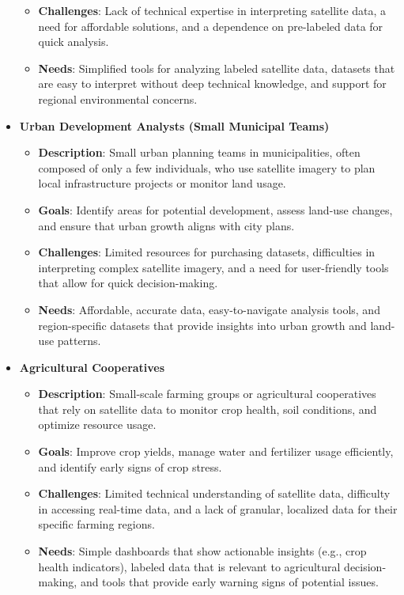 \documentclass[12pt]{article}
\begin{document}
\begin{itemize}
\begin{itemize}
        \item \textbf{Challenges}: Lack of technical expertise in interpreting satellite data, a need for affordable solutions, and a dependence on pre-labeled data for quick analysis.
        \item \textbf{Needs}: Simplified tools for analyzing labeled satellite data, datasets that are easy to interpret without deep technical knowledge, and support for regional environmental concerns.
    \end{itemize}
    \item \textbf{Urban Development Analysts (Small Municipal Teams)}
    \begin{itemize}
        \item \textbf{Description}: Small urban planning teams in municipalities, often composed of only a few individuals, who use satellite imagery to plan local infrastructure projects or monitor land usage.
        \item \textbf{Goals}: Identify areas for potential development, assess land-use changes, and ensure that urban growth aligns with city plans.
        \item \textbf{Challenges}: Limited resources for purchasing datasets, difficulties in interpreting complex satellite imagery, and a need for user-friendly tools that allow for quick decision-making.
        \item \textbf{Needs}: Affordable, accurate data, easy-to-navigate analysis tools, and region-specific datasets that provide insights into urban growth and land-use patterns.
    \end{itemize}
    \item \textbf{Agricultural Cooperatives}
    \begin{itemize}
        \item \textbf{Description}: Small-scale farming groups or agricultural cooperatives that rely on satellite data to monitor crop health, soil conditions, and optimize resource usage.
        \item \textbf{Goals}: Improve crop yields, manage water and fertilizer usage efficiently, and identify early signs of crop stress.
        \item \textbf{Challenges}: Limited technical understanding of satellite data, difficulty in accessing real-time data, and a lack of granular, localized data for their specific farming regions.
        \item \textbf{Needs}: Simple dashboards that show actionable insights (e.g., crop health indicators), labeled data that is relevant to agricultural decision-making, and tools that provide early warning signs of potential issues.

\end{itemize}
\end{itemize}
\end{document}
